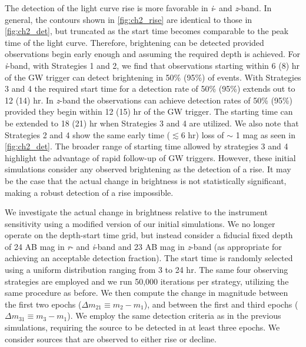 The detection of the light curve rise is more favorable in {\em i}- and {\em z}-band. In general, the contours shown in \autoref{fig:ch2_rise} are identical to those in \autoref{fig:ch2_det}, but truncated as the start time becomes comparable to the peak time of the light curve. Therefore, brightening can be detected provided observations begin early enough and assuming the required depth is achieved. For {\em i}-band, with Strategies 1 and 2, we find that observations starting within 6 (8) hr of the GW trigger can detect brightening in 50\% (95\%) of events. With Strategies 3 and 4 the required start time for a detection rate of 50\% (95\%) extends out to 12 (14) hr. In {\em z}-band the observations can achieve detection rates of 50\% (95\%) provided they begin within 12 (15) hr of the GW trigger. The starting time can be extended to 18 (21) hr when Strategies 3 and 4 are utilized. We also note that Strategies 2 and 4 show the same early time ($\lesssim 6$ hr) loss of $\sim$ 1 mag as seen in \autoref{fig:ch2_det}. The broader range of starting time allowed by strategies 3 and 4 highlight the advantage of rapid follow-up of GW triggers. However, these initial simulations consider any observed brightening as the detection of a rise. It may be the case that the actual change in brightness is not statistically significant, making a robust detection of a rise impossible.

We investigate the actual change in brightness relative to the instrument sensitivity using a modified version of our initial simulations. We no longer operate on the depth-start time grid, but instead consider a fiducial fixed depth of 24 AB mag in {\em r}- and {\em i}-band and 23 AB mag in {\em z}-band (as appropriate for achieving an acceptable detection fraction). The start time is randomly selected using a uniform distribution ranging from 3 to 24 hr. The same four observing strategies are employed and we run 50,000 iterations per strategy, utilizing the same procedure as before. We then compute the change in magnitude between the first two epochs ($\Delta m_{21} \equiv m_2 - m_1$), and between the first and third epochs ($\Delta m_{31} \equiv m_3 - m_1$). We employ the same detection criteria as in the previous simulations, requiring the source to be detected in at least three epochs. We consider sources that are observed to either rise or decline.

